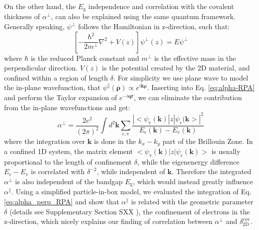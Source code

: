 \documentclass[journal=ancac3,manuscript=article,email=true,hyperref=true,keywords=false]{achemso}
\begin{document}
On the other hand, the $E_{\mathrm{g}}$ independence and correlation
with the covalent thickness of $\alpha^{\perp}$, can also be explained
using the same quantum framework. Generally speaking, $\psi^{\perp}$
follows the Hamiltonian in z-direction, such that:
\begin{equation}
  \label{eq:Hamil-z}
  \left[-\frac{\hbar^{2}}{2 m^{\perp}}\nabla^{2} + V(z)\right] \psi^{\perp}(z) = E \psi^{\perp}
\end{equation}
where $\hbar$ is the reduced Planck constant and $m^{\perp}$ is the
effective mass in the perpendicular direction. $V(z)$ is the potential
created by the 2D material, and confined within a region of length
$\delta$. For simplicity we use plane wave to model the in-plane
wavefunction, that
$\psi^{\parallel}(\mathbf{\rho}) \propto
e^{i\mathbf{k\rho}}$. Inserting into Eq. \ref{eq:alpha-RPA} and
perform the Taylor expansion of $e^{-i\mathbf{qr}}$, we can eliminate
the contribution from the in-plane
wavefunctions\cite{davies_physics_1997} and get:
\begin{equation}
  \label{eq:alpha_perp_RPA}
  \alpha^{\perp} = \frac{2e^{2}}{(2 \pi) ^{2}} \int d^{2}\mathbf{k}
  \sum_{\mathrm{c, v}}
  \frac{|<\psi_{\mathrm{v}}(\mathbf{k})|z|\psi_{\mathrm{c}}(\mathbf{k}>|^{2}}
  {E_{\mathrm{c}}(\mathbf{k}) - E_{\mathrm{v}}(\mathbf{k})}
\end{equation}
where the integration over $\mathbf{k}$ is done in the $k_{x}-k_{y}$
part of the Brillouin Zone. In a confined 1D system, the matrix
element
$<\psi_{\mathrm{v}}(\mathbf{k})|z|\psi_{\mathrm{c}}(\mathbf{k})>$ is
usually proportional to the length of confinement $\delta$, while the
eigenenergy difference $E_{\mathrm{c}}-E_{\mathrm{v}}$ is correlated
with $\delta^{-2}$, while independent of
$\mathbf{k}$\cite{Benedict_1995}. Therefore the integrated
$\alpha^{\perp}$ is also independent of the bandgap $E_{\mathrm{g}}$,
which would instead greatly influence $\alpha^{\parallel}$. Using a
simplified particle-in-box model, we evaluated the integration of
Eq. \ref{eq:alpha_perp_RPA} and show that $\alpha^{\parallel}$ is
related with the geometric parameter $\delta$ (details see Supplementary Section SXX ), the confinement of
electrons in the z-direction, which nicely explains our finding of
correlation between $\alpha^{\perp}$ and
$\delta^{\mathrm{cov}}_{\mathrm{2D}}$.
\end{document}
